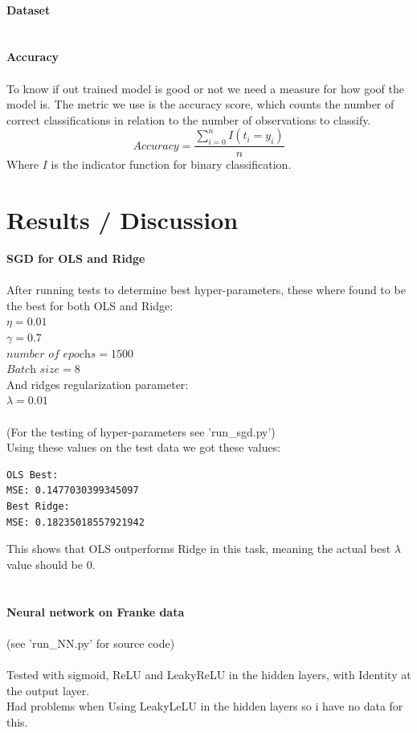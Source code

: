 \documentclass[12pt, letterpaper, twoside]{article}
\begin{document}
\ \\
\textbf{Dataset}\\
\ \\
\ \\
\textbf{Accuracy}\\
\ \\
To know if out trained model is good or not we need a measure for how goof the model is. The metric we use is the accuracy score, which counts the number of correct classifications in relation to the number of observations to classify.
$$
\textit{Accuracy} = \frac{\sum_{i=0}^n I(t_i = y_i)}{n} 
$$
Where $I$ is the indicator function for binary classification.\\
\newpage
\section{Results / Discussion}
\textbf{SGD for OLS and Ridge}\\
\ \\
After running tests to determine best hyper-parameters, these where found to be the best for both OLS and Ridge:\\
$\eta = 0.01$\\
$\gamma = 0.7$\\
$\textit{number of epochs} = 1500$\\
$\textit{Batch size} = 8$\\
And ridges regularization parameter:\\ 
$\lambda = 0.01$\\
\\
(For the testing of hyper-parameters see 'run\_sgd.py')\\
Using these values on the test data we got these values:
\begin{verbatim}
OLS Best:
MSE: 0.1477030399345097
Best Ridge:
MSE: 0.18235018557921942
\end{verbatim}
This shows that OLS outperforms Ridge in this task, meaning the actual best $\lambda$ value should be 0.\\
\ \\
\ \\
\textbf{Neural network on Franke data}\\
\ \\
(see 'run\_NN.py' for source code)\\
\ \\
Tested with sigmoid, ReLU and LeakyReLU in the hidden layers, with Identity at the output layer.\\
Had problems when Using LeakyLeLU in the hidden layers so i have no data for this.\\
\end{document}

